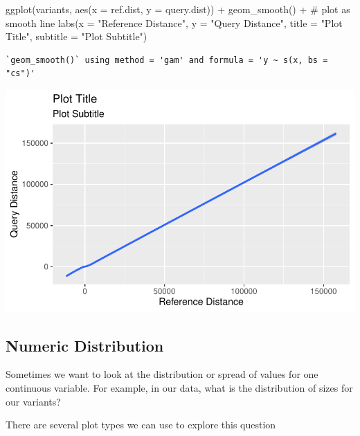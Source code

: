 \documentclass[
  letterpaper,
  DIV=11,
  numbers=noendperiod]{scrreprt}
\newenvironment{Shaded}{\begin{snugshade}}{\end{snugshade}}
\newcommand{\AttributeTok}[1]{\textcolor[rgb]{0.40,0.45,0.13}{#1}}
\newcommand{\CommentTok}[1]{\textcolor[rgb]{0.37,0.37,0.37}{#1}}
\newcommand{\FunctionTok}[1]{\textcolor[rgb]{0.28,0.35,0.67}{#1}}
\newcommand{\NormalTok}[1]{\textcolor[rgb]{0.00,0.23,0.31}{#1}}
\newcommand{\SpecialCharTok}[1]{\textcolor[rgb]{0.37,0.37,0.37}{#1}}
\newcommand{\StringTok}[1]{\textcolor[rgb]{0.13,0.47,0.30}{#1}}
\begin{document}
\begin{Shaded}
\begin{Highlighting}[]
\FunctionTok{ggplot}\NormalTok{(variants, }\FunctionTok{aes}\NormalTok{(}\AttributeTok{x =}\NormalTok{ ref.dist, }\AttributeTok{y =}\NormalTok{ query.dist)) }\SpecialCharTok{+}
  \FunctionTok{geom\_smooth}\NormalTok{() }\SpecialCharTok{+} \CommentTok{\# plot as smooth line}
  \FunctionTok{labs}\NormalTok{(}\AttributeTok{x =} \StringTok{"Reference Distance"}\NormalTok{,}
       \AttributeTok{y =} \StringTok{"Query Distance"}\NormalTok{,}
       \AttributeTok{title =} \StringTok{"Plot Title"}\NormalTok{,}
       \AttributeTok{subtitle =} \StringTok{"Plot Subtitle"}\NormalTok{)}
\end{Highlighting}
\end{Shaded}

\begin{verbatim}
`geom_smooth()` using method = 'gam' and formula = 'y ~ s(x, bs = "cs")'
\end{verbatim}

\includegraphics{scripts/02_dataViz/class3_files/figure-pdf/unnamed-chunk-12-2.pdf}

\subsection{Numeric Distribution}\label{numeric-distribution}

Sometimes we want to look at the distribution or spread of values for
one continuous variable. For example, in our data, what is the
distribution of sizes for our variants?

There are several plot types we can use to explore this question
\end{document}
